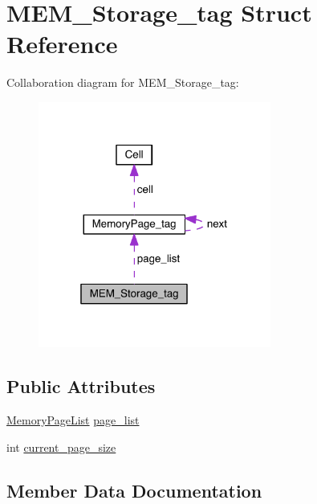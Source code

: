 \hypertarget{struct_m_e_m___storage__tag}{}\section{M\+E\+M\+\_\+\+Storage\+\_\+tag Struct Reference}
\label{struct_m_e_m___storage__tag}


Collaboration diagram for M\+E\+M\+\_\+\+Storage\+\_\+tag\+:\nopagebreak
\begin{figure}[H]
\begin{center}
\leavevmode
\includegraphics[width=217pt]{struct_m_e_m___storage__tag__coll__graph}
\end{center}
\end{figure}
\subsection*{Public Attributes}
\begin{DoxyCompactItemize}
\item 
\hyperlink{storage_8c_af4620055f96a48dc7cf903128aa4e665}{Memory\+Page\+List} \hyperlink{struct_m_e_m___storage__tag_a83d397628eca89e2d89a1fa6088c3b9a}{page\+\_\+list}
\item 
int \hyperlink{struct_m_e_m___storage__tag_ab81c5aee4e7f941cf9fa868e9f0ae654}{current\+\_\+page\+\_\+size}
\end{DoxyCompactItemize}


\subsection{Member Data Documentation}
\hypertarget{struct_m_e_m___storage__tag_ab81c5aee4e7f941cf9fa868e9f0ae654}{}
